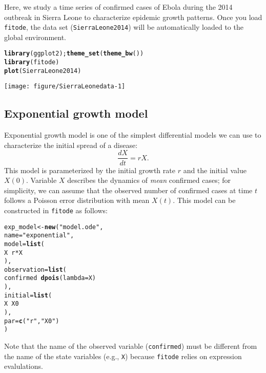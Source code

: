 \documentclass{article}\usepackage[]{graphicx}\usepackage[]{color}
\makeatletter
\def\maxwidth{ %
  \ifdim\Gin@nat@width>\linewidth
    \linewidth
  \else
    \Gin@nat@width
  \fi
}
\newcommand{\hlstr}[1]{\textcolor[rgb]{0.192,0.494,0.8}{#1}}%
\newcommand{\hlopt}[1]{\textcolor[rgb]{0,0,0}{#1}}%
\newcommand{\hlstd}[1]{\textcolor[rgb]{0.345,0.345,0.345}{#1}}%
\newcommand{\hlkwb}[1]{\textcolor[rgb]{0.69,0.353,0.396}{#1}}%
\newcommand{\hlkwc}[1]{\textcolor[rgb]{0.333,0.667,0.333}{#1}}%
\newcommand{\hlkwd}[1]{\textcolor[rgb]{0.737,0.353,0.396}{\textbf{#1}}}%
\newenvironment{kframe}{%
 \def\at@end@of@kframe{}%
 \ifinner\ifhmode%
  \def\at@end@of@kframe{\end{minipage}}%
  \begin{minipage}{\columnwidth}%
 \fi\fi%
 \def\FrameCommand##1{\hskip\@totalleftmargin \hskip-\fboxsep
 \colorbox{shadecolor}{##1}\hskip-\fboxsep
     \hskip-\linewidth \hskip-\@totalleftmargin \hskip\columnwidth}%
 \MakeFramed {\advance\hsize-\width
   \@totalleftmargin\z@ \linewidth\hsize
   \@setminipage}}%
 {\par\unskip\endMakeFramed%
 \at@end@of@kframe}
\newenvironment{knitrout}{}{} %
\makeatother
\begin{document}
Here, we study a time series of confirmed cases of Ebola during the 2014 outbreak in
Sierra Leone to characterize epidemic growth patterns. Once you load \texttt{fitode},
the data set (\texttt{SierraLeone2014}) will be automatically loaded to the global
environment.
\begin{knitrout}
\color{fgcolor}\begin{kframe}
\begin{alltt}
\hlkwd{library}\hlstd{(ggplot2);} \hlkwd{theme_set}\hlstd{(}\hlkwd{theme_bw}\hlstd{())}
\hlkwd{library}\hlstd{(fitode)}
\hlkwd{plot}\hlstd{(SierraLeone2014)}
\end{alltt}
\end{kframe}
\texttt{[image: figure/SierraLeonedata-1]} 

\end{knitrout}

\subsection{Exponential growth model}

Exponential growth model is one of the simplest differential models we can use to
characterize the initial spread of a disease:
\begin{equation}
\frac{dX}{dt} = rX.
\end{equation}
This model is parameterized by the initial growth rate $r$ and the initial value $X(0)$.
Variable $X$ describes the dynamics of \emph{mean} confirmed cases;
for simplicity, we can assume that the observed number of confirmed cases at time $t$ follows a
Poisson error distribution with mean $X(t)$. This model can be constructed in \texttt{fitode} as
follows:
\begin{knitrout}
\color{fgcolor}\begin{kframe}
\begin{alltt}
\hlstd{exp_model} \hlkwb{<-} \hlkwd{new}\hlstd{(}\hlstr{"model.ode"}\hlstd{,}
    \hlkwc{name}\hlstd{=}\hlstr{"exponential"}\hlstd{,}
    \hlkwc{model}\hlstd{=}\hlkwd{list}\hlstd{(}
        \hlstd{X} \hlopt{~} \hlstd{r} \hlopt{*} \hlstd{X}
    \hlstd{),}
    \hlkwc{observation}\hlstd{=}\hlkwd{list}\hlstd{(}
        \hlstd{confirmed} \hlopt{~} \hlkwd{dpois}\hlstd{(}\hlkwc{lambda}\hlstd{=X)}
    \hlstd{),}
    \hlkwc{initial}\hlstd{=}\hlkwd{list}\hlstd{(}
        \hlstd{X} \hlopt{~} \hlstd{X0}
    \hlstd{),}
    \hlkwc{par}\hlstd{=}\hlkwd{c}\hlstd{(}\hlstr{"r"}\hlstd{,} \hlstr{"X0"}\hlstd{)}
\hlstd{)}
\end{alltt}
\end{kframe}
\end{knitrout}
Note that the name of the observed variable (\texttt{confirmed}) must be different
from the name of the state variables (e.g., \texttt{X}) because \texttt{fitode}
relies on expression evalulations.
\end{document}
